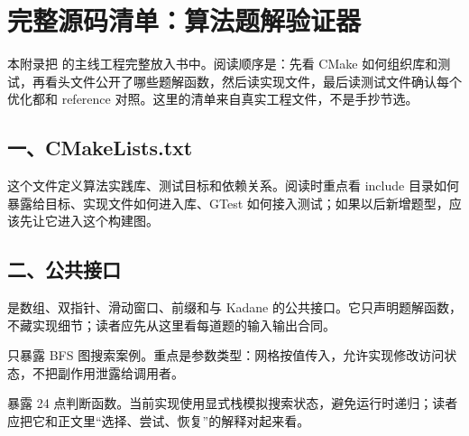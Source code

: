\chapter{完整源码清单：算法题解验证器}

本附录把  的主线工程完整放入书中。阅读顺序是：先看 CMake 如何组织库和测试，再看头文件公开了哪些题解函数，然后读实现文件，最后读测试文件确认每个优化都和 reference 对照。这里的清单来自真实工程文件，不是手抄节选。

\section{一、CMakeLists.txt}

这个文件定义算法实践库、测试目标和依赖关系。阅读时重点看 include 目录如何暴露给目标、实现文件如何进入库、GTest 如何接入测试；如果以后新增题型，应该先让它进入这个构建图。



\section{二、公共接口}

 是数组、双指针、滑动窗口、前缀和与 Kadane 的公共接口。它只声明题解函数，不藏实现细节；读者应先从这里看每道题的输入输出合同。




 只暴露 BFS 图搜索案例。重点是参数类型：网格按值传入，允许实现修改访问状态，不把副作用泄露给调用者。




 暴露 24 点判断函数。当前实现使用显式栈模拟搜索状态，避免运行时递归；读者应把它和正文里“选择、尝试、恢复”的解释对起来看。



